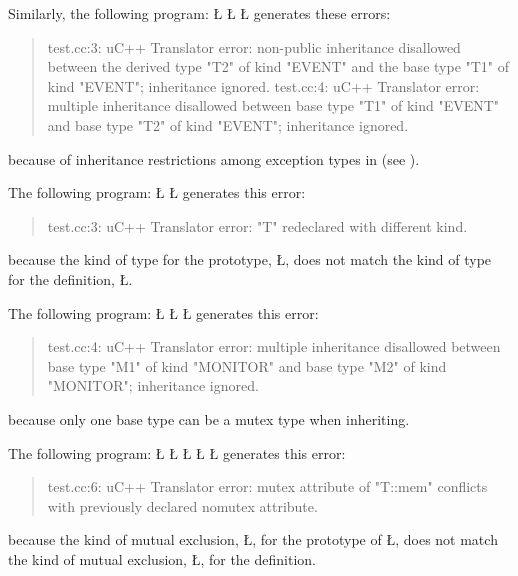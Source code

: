 \documentclass[openright,twoside]{report}
\begin{document}
Similarly, the following program:
\LGinlinefalse\LGbegin\lgrinde
\L{}
\L{}
\L{}
\endlgrinde\LGend
generates these errors:
\begin{quote}
\BGfont
test.cc:3: uC++ Translator error: non-public inheritance disallowed between the derived type "T2" of kind "EVENT" and the base type "T1" of kind "EVENT"; inheritance ignored.
\newline
test.cc:4: uC++ Translator error: multiple inheritance disallowed between base type "T1" of kind "EVENT" and base type "T2" of kind "EVENT"; inheritance ignored.
\end{quote}
because of inheritance restrictions among exception types in \uC (see ).

The following program:
\LGinlinefalse\LGbegin\lgrinde
\L{}
\CE{}\L{}
\CE{}\endlgrinde\LGend
generates this error:
\begin{quote}
\BGfont
test.cc:3: uC++ Translator error: "T" redeclared with different kind.
\end{quote}
because the kind of type for the prototype, \LGinlinetrue\LGbegin\lgrinde\L{}\endlgrinde\LGend{}, does not match the kind of type for the definition, \LGinlinetrue\LGbegin\lgrinde\L{}\endlgrinde\LGend{}.

The following program:
\LGinlinefalse\LGbegin\lgrinde
\L{}
\L{}
\L{}
\CE{}\endlgrinde\LGend
generates this error:
\begin{quote}
\BGfont
test.cc:4: uC++ Translator error: multiple inheritance disallowed between base type "M1" of kind "MONITOR" and base type "M2" of kind "MONITOR"; inheritance ignored.
\end{quote}
because only one base type can be a mutex type when inheriting.

The following program:
\LGinlinefalse\LGbegin\lgrinde
\L{}
\L{}
\L{\LB{}}
\L{\LB{\};}}
\L{}
\endlgrinde\LGend
generates this error:
\begin{quote}
\BGfont
test.cc:6: uC++ Translator error: mutex attribute of "T::mem" conflicts with previously declared nomutex attribute.
\end{quote}
because the kind of mutual exclusion, \LGinlinetrue\LGbegin\lgrinde\L{}\endlgrinde\LGend{}, for the prototype of \LGinlinetrue\LGbegin\lgrinde\L{}\endlgrinde\LGend{}, does not match the kind of mutual exclusion, \LGinlinetrue\LGbegin\lgrinde\L{}\endlgrinde\LGend{}, for the definition.
\end{document}
